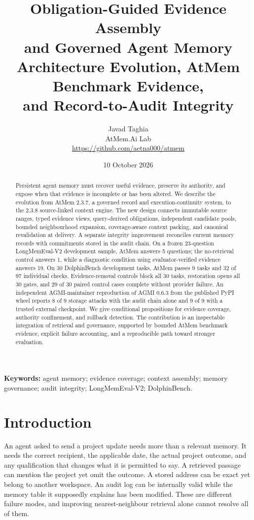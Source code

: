 \documentclass[11pt]{article}
\title{\vspace{-1.1cm}\textbf{Obligation-Guided Evidence Assembly\\and Governed Agent Memory}\\[0.35em]
\large Architecture Evolution, AtMem Benchmark Evidence,\\and Record-to-Audit Integrity}
\author{Javad Taghia\\\small AtMem.Ai Lab\\\small\url{https://github.com/aetna000/atmem}}
\date{10 October 2026}
\begin{document}
\maketitle
\begin{abstract}
Persistent agent memory must recover useful evidence, preserve its authority, and expose when that evidence is incomplete or has been altered. We describe the evolution from AtMem 2.3.7, a governed record and execution-continuity system, to the 2.3.8 source-linked context engine. The new design connects immutable source ranges, typed evidence views, query-derived obligations, independent candidate pools, bounded neighbourhood expansion, coverage-aware context packing, and canonical revalidation at delivery. A separate integrity improvement reconciles current memory records with commitments stored in the audit chain. On a frozen 23-question LongMemEval-V2 development sample, AtMem answers 5 questions; the no-retrieval control answers 1, while a diagnostic condition using evaluator-verified evidence answers 19. On 30 DolphinBench development tasks, AtMem passes 9 tasks and 32 of 97 individual checks. Evidence-removal controls block all 30 tasks, restoration opens all 30 gates, and 29 of 30 paired control cases complete without provider failure. An independent AGMI-maintainer reproduction of AGMI 0.6.3 from the published PyPI wheel reports 8 of 9 storage attacks with the audit chain alone and 9 of 9 with a trusted external checkpoint. We give conditional propositions for evidence coverage, authority confinement, and rollback detection. The contribution is an inspectable integration of retrieval and governance, supported by bounded AtMem benchmark evidence, explicit failure accounting, and a reproducible path toward stronger evaluation.
\end{abstract}
\noindent\textbf{Keywords:} agent memory; evidence coverage; context assembly; memory governance; audit integrity; LongMemEval-V2; DolphinBench.

\section{Introduction}
An agent asked to send a project update needs more than a relevant memory. It needs the correct recipient, the applicable date, the actual project outcome, and any qualification that changes what it is permitted to say. A retrieved passage can mention the project yet omit the outcome. A stored address can be exact yet belong to another workspace. An audit log can be internally valid while the memory table it supposedly explains has been modified. These are different failure modes, and improving nearest-neighbour retrieval alone cannot resolve all of them.
\end{document}
